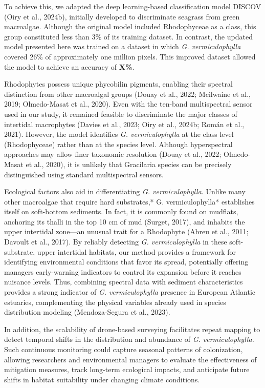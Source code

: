 \documentclass[
  letterpaper,
  DIV=11,
  numbers=noendperiod]{scrartcl}
\begin{document}
To achieve this, we adapted the deep learning-based classification model
DISCOV (Oiry et al., 2024b), initially developed to discriminate
seagrass from green macroalgae. Although the original model included
Rhodophyceae as a class, this group constituted less than 3\% of its
training dataset. In contrast, the updated model presented here was
trained on a dataset in which \emph{G. vermiculophylla} covered 26\% of
approximately one million pixels. This improved dataset allowed the
model to achieve an accuracy of \textbf{X\%}.

Rhodophytes possess unique phycobilin pigments, enabling their spectral
distinction from other macroalgal groups (Douay et al., 2022; Mcilwaine
et al., 2019; Olmedo-Masat et al., 2020). Even with the ten-band
multispectral sensor used in our study, it remained feasible to
discriminate the major classes of intertidal macrophytes (Davies et al.,
2023; Oiry et al., 2024b; Román et al., 2021). However, the model
identifies \emph{G. vermiculophylla} at the class level (Rhodophyceae)
rather than at the species level. Although hyperspectral approaches may
allow finer taxonomic resolution (Douay et al., 2022; Olmedo-Masat et
al., 2020), it is unlikely that Gracilaria species can be precisely
distinguished using standard multispectral sensors.

Ecological factors also aid in differentiating \emph{G.
vermiculophylla}. Unlike many other macroalgae that require hard
substrates,* G. vermiculophylla* establishes itself on soft-bottom
sediments. In fact, it is commonly found on mudflats, anchoring its
thalli in the top 10 cm of mud (Surget, 2017), and inhabits the upper
intertidal zone---an unusual trait for a Rhodophyte (Abreu et al., 2011;
Davoult et al., 2017). By reliably detecting \emph{G. vermiculophylla}
in these soft-substrate, upper intertidal habitats, our method provides
a framework for identifying environmental conditions that favor its
spread, potentially offering managers early-warning indicators to
control its expansion before it reaches nuisance levels. Thus, combining
spectral data with sediment characteristics provides a strong indicator
of \emph{G. vermiculophylla} presence in European Atlantic estuaries,
complementing the physical variables already used in species
distribution modeling (Mendoza-Segura et al., 2023).

In addition, the scalability of drone-based surveying facilitates repeat
mapping to detect temporal shifts in the distribution and abundance of
\emph{G. vermiculophylla.} Such continuous monitoring could capture
seasonal patterns of colonization, allowing researchers and
environmental managers to evaluate the effectiveness of mitigation
measures, track long-term ecological impacts, and anticipate future
shifts in habitat suitability under changing climate conditions.
\end{document}
